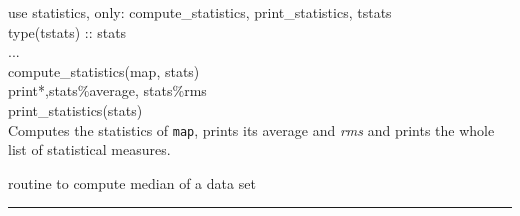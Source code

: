 \begin{example}
{
use statistics, only: compute\_statistics, print\_statistics, tstats \\
type(tstats) :: stats \\
... \\
compute\_statistics(map, stats)  \\
print*,stats\%average, stats\%rms\\
print\_statistics(stats) \\
}
{
Computes the statistics of {\tt map}, prints its average and {\em rms} and
prints the whole list of statistical measures.
}
\end{example}


\begin{related}
  \begin{sulist}{} %
  \item[\htmlref{median}{sub:median}] routine to compute median of a data set
  \end{sulist}
\end{related}

\rule{\hsize}{2mm}

\newpage
